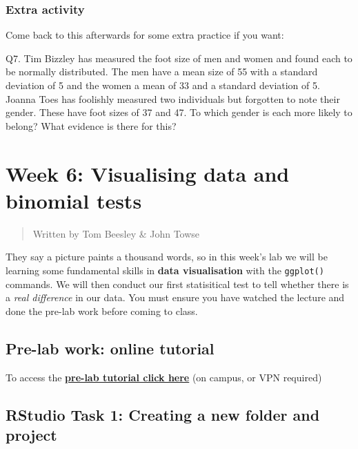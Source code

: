\documentclass[
]{book}
\begin{document}
\hypertarget{extra-activity}{%
\subsection{Extra activity}\label{extra-activity}}

Come back to this afterwards for some extra practice if you want:

Q7. Tim Bizzley has measured the foot size of men and women and found each to be normally distributed. The men have a mean size of 55 with a standard deviation of 5 and the women a mean of 33 and a standard deviation of 5. Joanna Toes has foolishly measured two individuals but forgotten to note their gender. These have foot sizes of 37 and 47. To which gender is each more likely to belong? What evidence is there for this?

\hypertarget{week-6-visualising-data-and-binomial-tests}{%
\chapter{Week 6: Visualising data and binomial tests}\label{week-6-visualising-data-and-binomial-tests}}

\begin{quote}
Written by Tom Beesley \& John Towse
\end{quote}

They say a picture paints a thousand words, so in this week's lab we will be learning some fundamental skills in \textbf{data visualisation} with the \texttt{ggplot()} commands. We will then conduct our first statisitical test to tell whether there is a \emph{real difference} in our data. You must ensure you have watched the lecture and done the pre-lab work before coming to class.

\hypertarget{pre-lab-work-online-tutorial}{%
\section{Pre-lab work: online tutorial}\label{pre-lab-work-online-tutorial}}

To access the \href{https://ma-rconnect.lancs.ac.uk/Week_6_LabPrep}{\textbf{pre-lab tutorial click here}} (on campus, or VPN required)

\hypertarget{rstudio-task-1-creating-a-new-folder-and-project}{%
\section{RStudio Task 1: Creating a new folder and project}\label{rstudio-task-1-creating-a-new-folder-and-project}}
\end{document}

